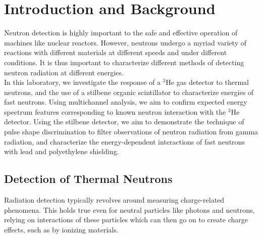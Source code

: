 \documentclass[12pt]{article}
\newcommand{\HeThree}{$\mathrm{^3He}$\xspace}
\begin{document}
\begin{abstract}
These results confirm the expected reaction behavior of the \HeThree detector medium to thermal neutrons, the efficacy of pulse shape discrimination between gamma and neutron radiation in organic scintillators, and the energy variation in shielding abilities between lead and polyethylene, in particular demonstrating the ability of polyethylene to thermalize neutron sources.
These results may be of use to those considering the use of \HeThree detectors for thermal neutron detection, the use of organic scintillators to perform neutron spectroscopy (and in particular the technique of pulse shape discrimination), and those wishing to shield selectively against different energies of neutron radiation, for example to thermalize neutrons from a predominantly fast neutron source.
\end{abstract}

\section{Introduction and Background}

Neutron detection is highly important to the safe and effective operation of machines like nuclear reactors.
However, neutrons undergo a myriad variety of reactions with different materials at different speeds and under different conditions.
It is thus important to characterize different methods of detecting neutron radiation at different energies.\\

In this laboratory, we investigate the response of a \HeThree gas detector to thermal neutrons, and the use of a stilbene organic scintillator to characterize energies of fast neutrons.
Using multichannel analysis, we aim to confirm expected energy spectrum features corresponding to known neutron interaction with the \HeThree detector.
Using the stilbene detector, we aim to demonstrate the technique of pulse shape discrimination to filter observations of neutron radiation from gamma radiation, and characterize the energy-dependent interactions of fast neutrons with lead and polyethylene shielding.

\subsection{Detection of Thermal Neutrons}
\FloatBarrier
Radiation detection typically revolves around measuring charge-related phenomena.\cite{npre_lab_9_manual_2025}
This holds true even for neutral particles like photons and neutrons, relying on interactions of these particles which can then go on to create charge effects, such as by ionizing materials.\\
\end{document}
